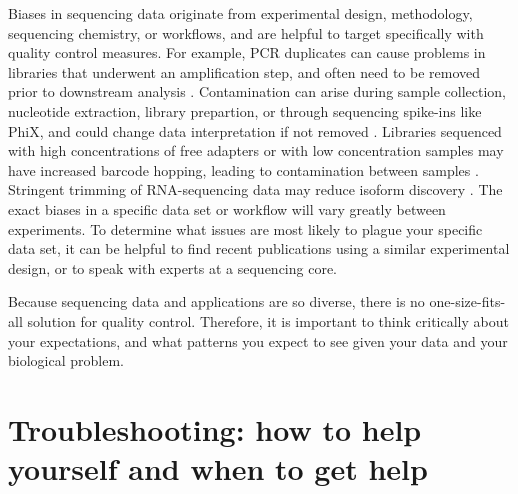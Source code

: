 \documentclass[10pt,letterpaper]{article}
\begin{document}
Biases in sequencing data originate from experimental design, methodology, sequencing chemistry, or workflows, and are helpful to target specifically with quality control measures. 
For example, PCR duplicates can cause problems in libraries that underwent an amplification step, and often need to be removed prior to downstream analysis \cite{meyer2014identifying, parekh2016impact, schweyen2014detection, fu2018elimination, smith2014biased}. 
Contamination can arise during sample collection, nucleotide extraction, library prepartion, or through sequencing spike-ins like PhiX, and could change data interpretation if not removed \cite{boothby2015evidence, koutsovoulos2016no, mukherjee2015large}.
Libraries sequenced with high concentrations of free adapters or with low concentration samples may have increased barcode hopping, leading to contamination between samples \cite{van2019index}. 
Stringent trimming of RNA-sequencing data may reduce isoform discovery \cite{macmanes2014optimal}. 
The exact biases in a specific data set or workflow will vary greatly between experiments. 
To determine what issues are most likely to plague your specific data set, it can be helpful to find recent publications using a similar experimental design, or to speak with experts at a sequencing core.


Because sequencing data and applications are so diverse, there is no one-size-fits-all solution for quality control. 
Therefore, it is important to think critically about your expectations, and what patterns you expect to see given your data and your biological problem. 


\section*{Troubleshooting: how to help yourself and when to get help}
\end{document}
